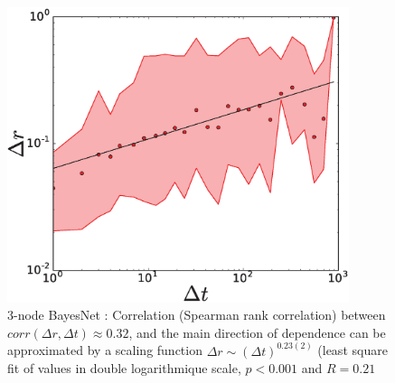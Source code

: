 \begin{figure}[h!]
\begin{center}
\includegraphics[width=10cm]{figures/cor_Delta_t_Delta_r_simple.eps}
\caption{3-node BayesNet : Correlation (Spearman rank correlation) between $corr(\Delta r,\Delta t) \approx 0.32$, and the main direction of dependence can be approximated by a scaling function $\Delta r \sim {(\Delta t)}^{0.23(2)}$ (least square fit of values in double logarithmique scale, $p < 0.001$ and $R= 0.21$}
\label{fig:corr_dr_dt}
\end{center}
\end{figure}




